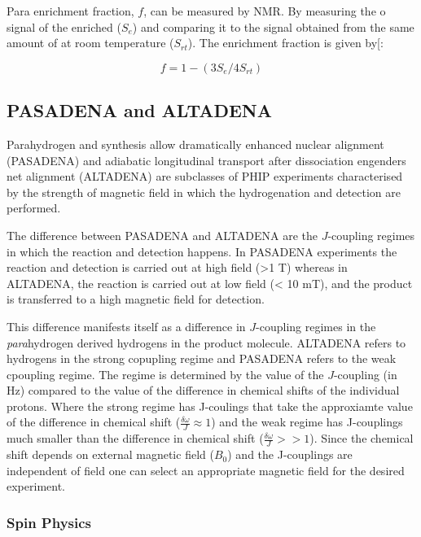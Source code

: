  Para enrichment fraction, $f$, can be measured by NMR. By measuring the o signal of the enriched  ($S_{e}$) and comparing it to the signal obtained from the same amount of  at room temperature ($S_{rt}$). The enrichment fraction is given by[\citep{RN131, RN132}:

 \begin{equation}\label{pfrac}
   f = 1 -(3S_{e}/4S_{rt})
 \end{equation}

 \subsection{PASADENA and ALTADENA}\label{PASADENA and ALTADENA}

 Parahydrogen and synthesis allow dramatically enhanced nuclear alignment (PASADENA)\citep{RN129} and adiabatic longitudinal transport after dissociation engenders net alignment (ALTADENA)\citep{RN128}
  are subclasses of PHIP experiments characterised by the strength of magnetic
 field in which the hydrogenation and detection are performed.

 The difference between PASADENA and ALTADENA are the $J$-coupling regimes in which the reaction and detection happens. In PASADENA experiments the reaction and detection is carried out at high field (>1 T) whereas in
 ALTADENA, the reaction is carried out at low field (< 10 mT), and the product is transferred to a high magnetic field for detection\citep{RN130}.

 This difference manifests itself as a difference in $J$-coupling regimes in the \textit{para}hydrogen derived hydrogens in the product molecule. ALTADENA refers to hydrogens in the strong copupling regime and PASADENA refers to the weak cpoupling regime. The regime is determined by the value of the $J$-coupling (in Hz) compared to the value of the difference in chemical shifts of the individual protons.
 Where the strong regime has J-coulings that take the approxiamte value of the difference in chemical shift ($\frac{\delta{\omega}}{J}\approx1$) and the weak regime has J-couplings much smaller than the difference in chemical shift ($\frac{\delta{\omega}}{J}>>1$). Since the chemical shift depends on external magnetic field ($B_{0}$) and the J-couplings are independent of field one can select an appropriate magnetic field for the desired experiment.

 \subsubsection{Spin Physics}

